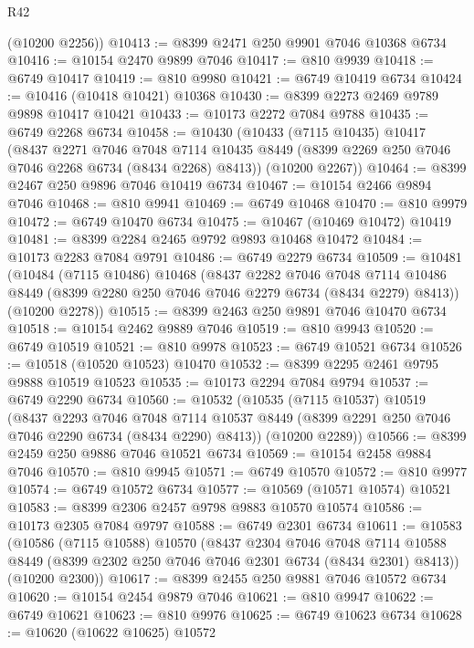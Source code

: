 \begin{lexlean}{R42}
\begin{coremodule}
{      (@10200 @2256))
@10413 := @8399 @2471 @250 @9901 @7046 @10368 @6734
@10416 := @10154 @2470 @9899 @7046
@10417 := @810 @9939
@10418 := @6749 @10417
@10419 := @810 @9980
@10421 := @6749 @10419 @6734
@10424 := @10416 (@10418 @10421) @10368
@10430 := @8399 @2273 @2469 @9789 @9898 @10417 @10421
@10433 := @10173 @2272 @7084 @9788
@10435 := @6749 @2268 @6734
@10458 := @10430
    (@10433
      (@7115 @10435)
      @10417
      (@8437
        @2271
        @7046
        @7048
        @7114
        @10435
        @8449
        (@8399 @2269 @250 @7046 @7046 @2268 @6734 (@8434 @2268) @8413))
      (@10200 @2267))
@10464 := @8399 @2467 @250 @9896 @7046 @10419 @6734
@10467 := @10154 @2466 @9894 @7046
@10468 := @810 @9941
@10469 := @6749 @10468
@10470 := @810 @9979
@10472 := @6749 @10470 @6734
@10475 := @10467 (@10469 @10472) @10419
@10481 := @8399 @2284 @2465 @9792 @9893 @10468 @10472
@10484 := @10173 @2283 @7084 @9791
@10486 := @6749 @2279 @6734
@10509 := @10481
    (@10484
      (@7115 @10486)
      @10468
      (@8437
        @2282
        @7046
        @7048
        @7114
        @10486
        @8449
        (@8399 @2280 @250 @7046 @7046 @2279 @6734 (@8434 @2279) @8413))
      (@10200 @2278))
@10515 := @8399 @2463 @250 @9891 @7046 @10470 @6734
@10518 := @10154 @2462 @9889 @7046
@10519 := @810 @9943
@10520 := @6749 @10519
@10521 := @810 @9978
@10523 := @6749 @10521 @6734
@10526 := @10518 (@10520 @10523) @10470
@10532 := @8399 @2295 @2461 @9795 @9888 @10519 @10523
@10535 := @10173 @2294 @7084 @9794
@10537 := @6749 @2290 @6734
@10560 := @10532
    (@10535
      (@7115 @10537)
      @10519
      (@8437
        @2293
        @7046
        @7048
        @7114
        @10537
        @8449
        (@8399 @2291 @250 @7046 @7046 @2290 @6734 (@8434 @2290) @8413))
      (@10200 @2289))
@10566 := @8399 @2459 @250 @9886 @7046 @10521 @6734
@10569 := @10154 @2458 @9884 @7046
@10570 := @810 @9945
@10571 := @6749 @10570
@10572 := @810 @9977
@10574 := @6749 @10572 @6734
@10577 := @10569 (@10571 @10574) @10521
@10583 := @8399 @2306 @2457 @9798 @9883 @10570 @10574
@10586 := @10173 @2305 @7084 @9797
@10588 := @6749 @2301 @6734
@10611 := @10583
    (@10586
      (@7115 @10588)
      @10570
      (@8437
        @2304
        @7046
        @7048
        @7114
        @10588
        @8449
        (@8399 @2302 @250 @7046 @7046 @2301 @6734 (@8434 @2301) @8413))
      (@10200 @2300))
@10617 := @8399 @2455 @250 @9881 @7046 @10572 @6734
@10620 := @10154 @2454 @9879 @7046
@10621 := @810 @9947
@10622 := @6749 @10621
@10623 := @810 @9976
@10625 := @6749 @10623 @6734
@10628 := @10620 (@10622 @10625) @10572
}
\end{coremodule}
\end{lexlean}
